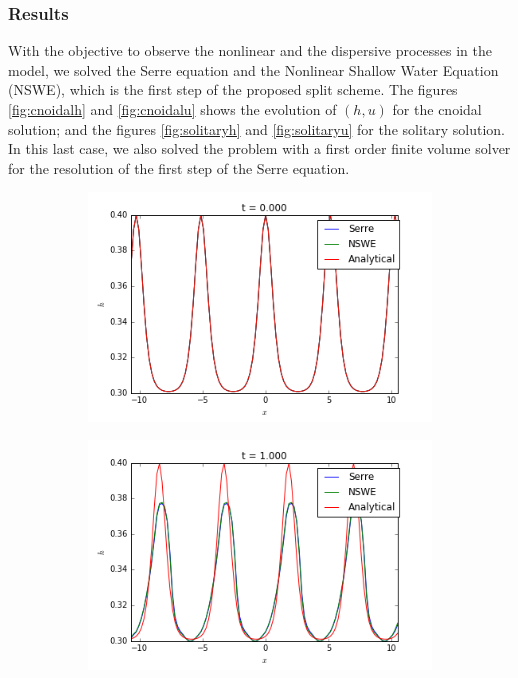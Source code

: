 \subsubsection{Results}

\indent With the objective to observe the nonlinear and the dispersive processes in the model, we solved the Serre equation and the Nonlinear Shallow Water Equation (NSWE), which is the first step of the proposed split scheme. The figures \ref{fig:cnoidalh} and \ref{fig:cnoidalu} shows the evolution of $(h,u)$ for the cnoidal solution; and the figures \ref{fig:solitaryh} and \ref{fig:solitaryu} for the solitary solution. In this last case, we also solved the problem with a first order finite volume solver for the resolution of the first step of the Serre equation.

\begin{figure}[h!]
	\begin{subfigure}{.3\linewidth}
		\includegraphics[scale=.3]{figures/Serre/cnoidal1h.png}	
	\end{subfigure}
	\begin{subfigure}{.3\linewidth}
		\includegraphics[scale=.3]{figures/Serre/cnoidal2h.png}	

\end{subfigure}
\end{figure}
